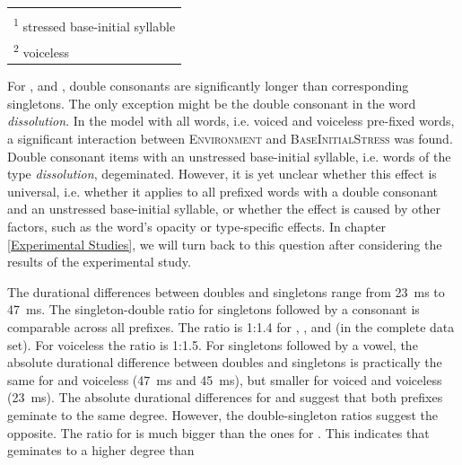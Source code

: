 \begin{table}[!t]
{\begin{tabular} {lcccc}
			
			\midrule
			\\

			\multicolumn{5}{l}{\textsuperscript{1} \footnotesize{stressed base-initial syllable}}\\
			\multicolumn{5}{l}{\textsuperscript{2} \footnotesize{voiceless}}\\

		\end{tabular}
	}
	
	

	
\end{table}


For ,  and , double consonants are significantly longer than corresponding singletons. The only exception might be the double consonant in the word \textit{dissolution}. In the model with all words, i.e. voiced and voiceless pre-fixed words, a significant interaction between \textsc{Environment} and \textsc{BaseInitialStress} was found. Double consonant items with an unstressed base-initial syllable, i.e. words of the type \textit{dissolution}, degeminated. However, it is yet unclear whether this effect is universal, i.e. whether it applies to all prefixed words with a double consonant and an unstressed base-initial syllable,  or whether the effect is caused by other factors, such as the word's opacity or type-specific effects. In chapter \ref{Experimental Studies}, we will turn back to this question after considering the results of the experimental study.

The durational differences between doubles and singletons range from 23~ms to 47~ms.  The singleton-double ratio for singletons followed by a consonant is comparable across all prefixes. The ratio is 1:1.4 for , , and  (in the complete data set). For voiceless  the ratio is 1:1.5.
For singletons followed by a vowel, the absolute durational difference between doubles and singletons is practically the same for  and voiceless  (47~ms and 45~ms), but smaller for voiced and voiceless  (23~ms). The absolute durational differences for  and  suggest that both prefixes geminate to the same degree. However, the double-singleton ratios suggest the opposite. The ratio for  is much bigger than the ones for . This indicates that  geminates to a higher degree than 


